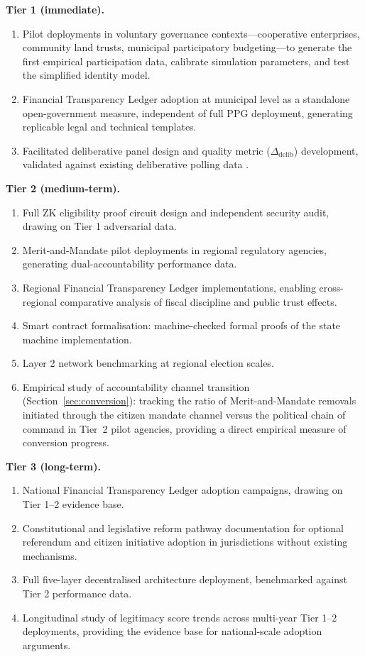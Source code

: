 \documentclass[12pt,a4paper,oneside]{report}
\begin{document}
\textbf{Tier 1 (immediate).}
\begin{enumerate}
  \item Pilot deployments in voluntary governance contexts---cooperative enterprises, community land trusts, municipal participatory budgeting---to generate the first empirical participation data, calibrate simulation parameters, and test the simplified identity model.
  \item Financial Transparency Ledger adoption at municipal level as a standalone open-government measure, independent of full PPG deployment, generating replicable legal and technical templates.
  \item Facilitated deliberative panel design and quality metric ($\Delta_{\text{delib}}$) development, validated against existing deliberative polling data \citep{fishkin2018stanford}.
\end{enumerate}

\textbf{Tier 2 (medium-term).}
\begin{enumerate}
  \item Full ZK eligibility proof circuit design and independent security audit, drawing on Tier 1 adversarial data.
  \item Merit-and-Mandate pilot deployments in regional regulatory agencies, generating dual-accountability performance data.
  \item Regional Financial Transparency Ledger implementations, enabling cross-regional comparative analysis of fiscal discipline and public trust effects.
  \item Smart contract formalisation: machine-checked formal proofs of the state machine implementation.
  \item Layer 2 network benchmarking at regional election scales.
  \item Empirical study of accountability channel transition (Section~\ref{sec:conversion}): tracking the ratio of Merit-and-Mandate removals initiated through the citizen mandate channel versus the political chain of command in Tier~2 pilot agencies, providing a direct empirical measure of conversion progress.
\end{enumerate}

\textbf{Tier 3 (long-term).}
\begin{enumerate}
  \item National Financial Transparency Ledger adoption campaigns, drawing on Tier 1--2 evidence base.
  \item Constitutional and legislative reform pathway documentation for optional referendum and citizen initiative adoption in jurisdictions without existing mechanisms.
  \item Full five-layer decentralised architecture deployment, benchmarked against Tier 2 performance data.
  \item Longitudinal study of legitimacy score trends across multi-year Tier 1--2 deployments, providing the evidence base for national-scale adoption arguments.
\end{enumerate}
\end{document}
